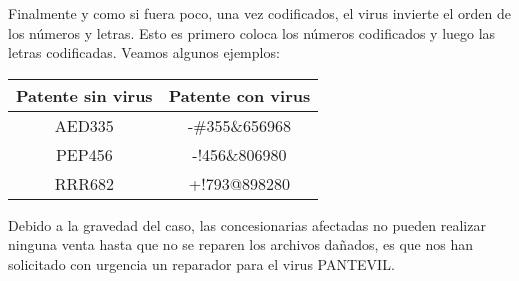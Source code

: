Finalmente y como si fuera poco, una vez codificados, el virus invierte el orden de los números y letras. Esto es primero coloca los números codificados y luego las letras codificadas. Veamos algunos ejemplos:

{\renewcommand{\arraystretch}{1.5}

\begin{center}	
\begin{tabular}{c | c}
	Patente sin virus & Patente con virus \\ 
	\hline
    AED335 & -\#355\&656968 \\
    PEP456 & -!456\&806980 \\
    RRR682 & +!793@898280 \\
\end{tabular} 
\end{center}
}

Debido a la gravedad del caso, las concesionarias afectadas no pueden realizar ninguna venta hasta que no se reparen los archivos dañados, es que nos han solicitado con urgencia un reparador para el virus PANTEVIL.
